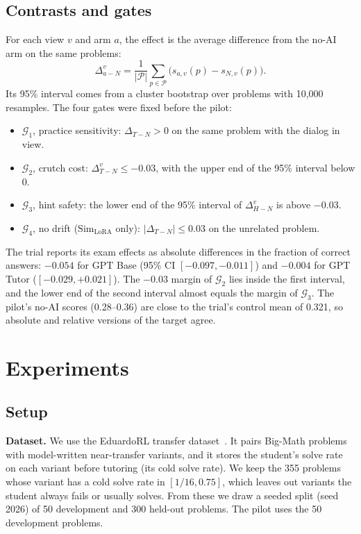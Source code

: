\documentclass{article} %
\newcommand{\simL}{\ensuremath{\text{Sim}_{\text{LoRA}}}}
\newcommand{\gate}[1]{\ensuremath{\mathcal{G}_{#1}}}
\begin{document}
\subsection{Contrasts and gates}
For each view $v$ and arm $a$, the effect is the average difference from the no-AI arm on the same problems:
\begin{equation}
\Delta^{v}_{a-N}=\frac{1}{|\mathcal{P}|}\sum_{p\in\mathcal{P}}\bigl(s_{a,v}(p)-s_{N,v}(p)\bigr).
\end{equation}
Its 95\% interval comes from a cluster bootstrap over problems with 10{,}000 resamples. The four gates were fixed before the pilot:
\begin{itemize}
\item \gate{1}, practice sensitivity: $\Delta_{T-N}>0$ on the same problem with the dialog in view.
\item \gate{2}, crutch cost: $\Delta^{v}_{T-N}\le-0.03$, with the upper end of the 95\% interval below 0.
\item \gate{3}, hint safety: the lower end of the 95\% interval of $\Delta^{v}_{H-N}$ is above $-0.03$.
\item \gate{4}, no drift (\simL{} only): $|\Delta_{T-N}|\le0.03$ on the unrelated problem.
\end{itemize}
The trial reports its exam effects as absolute differences in the fraction of correct answers: $-0.054$ for GPT Base (95\% CI $[-0.097,-0.011]$) and $-0.004$ for GPT Tutor ($[-0.029,+0.021]$). The $-0.03$ margin of \gate{2} lies inside the first interval, and the lower end of the second interval almost equals the margin of \gate{3}. The pilot's no-AI scores (0.28--0.36) are close to the trial's control mean of 0.321, so absolute and relative versions of the target agree.

\section{Experiments}
\label{sec:experiment}

\subsection{Setup}
\textbf{Dataset.} We use the EduardoRL transfer dataset~\citep{macina2026assistance}. It pairs Big-Math problems~\citep{albalak2025bigmath} with model-written near-transfer variants, and it stores the student's solve rate on each variant before tutoring (its cold solve rate). We keep the 355 problems whose variant has a cold solve rate in $[1/16, 0.75]$, which leaves out variants the student always fails or usually solves. From these we draw a seeded split (seed 2026) of 50 development and 300 held-out problems. The pilot uses the 50 development problems.
\end{document}
